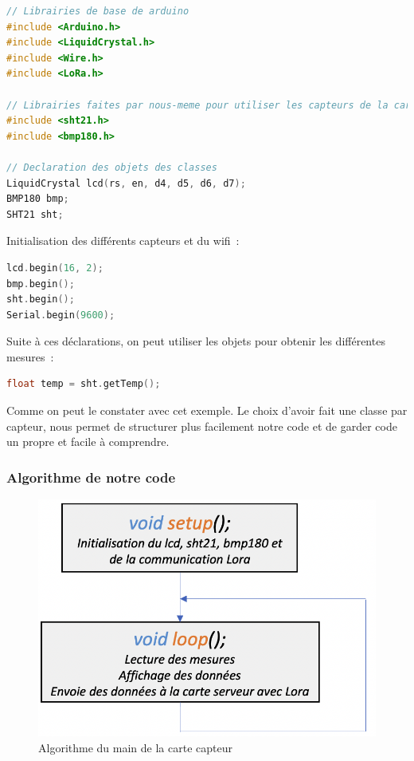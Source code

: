 \begin{lstlisting}[style=myC, caption=Ajout des librairies et déclaration des objets, language=C, frame=lines]
// Librairies de base de arduino
#include <Arduino.h>
#include <LiquidCrystal.h>
#include <Wire.h>
#include <LoRa.h>

// Librairies faites par nous-meme pour utiliser les capteurs de la carte serveur
#include <sht21.h>
#include <bmp180.h>

// Declaration des objets des classes
LiquidCrystal lcd(rs, en, d4, d5, d6, d7);
BMP180 bmp;
SHT21 sht;
\end{lstlisting}

            \vspace{.5 cm}  

            \noindent
            Initialisation des différents capteurs et du wifi~: 


\begin{lstlisting}[style=myC, caption=Initialisation, language=C, frame=lines]
lcd.begin(16, 2);
bmp.begin();
sht.begin();
Serial.begin(9600);
\end{lstlisting}

            \vspace{.5 cm}

            \noindent
            Suite à ces déclarations, on peut utiliser les objets pour obtenir les différentes mesures~: 

\begin{lstlisting}[style=myC, caption=Lecture de température sur le SHT21, language=C, frame=lines]
float temp = sht.getTemp();
\end{lstlisting}

            \vspace{.5 cm}
            Comme on peut le constater avec cet exemple. Le choix d'avoir fait une classe par capteur, nous permet de structurer plus facilement notre code et de garder code un propre et facile à comprendre.\\

            \subsubsection{Algorithme de notre code}

                \begin{figure}[!h]
                    \begin{center}
                        \includegraphics[width=.4\textwidth]{img/code/algo_main_sensor.png}
                        \caption{\label{fig:algo_main_sensor}Algorithme du main de la carte capteur}  
                    \end{center}
                \end{figure}




